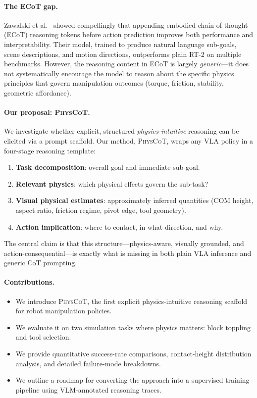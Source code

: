 \documentclass{article}
\newcommand{\physcot}{\textsc{PhysCoT}}
\begin{document}
\paragraph{The ECoT gap.}
Zawalski et al.~\citep{zawalski2024ecot} showed compellingly that
appending embodied chain-of-thought (ECoT) reasoning tokens before action
prediction improves both performance and interpretability.
Their model, trained to produce natural language sub-goals, scene descriptions,
and motion directions, outperforms plain RT-2 on multiple benchmarks.
However, the reasoning content in ECoT is largely \emph{generic}—it does not
systematically encourage the model to reason about the specific physics
principles that govern manipulation outcomes (torque, friction, stability,
geometric affordance).

\paragraph{Our proposal: \physcot{}.}
We investigate whether explicit, structured \emph{physics-intuitive} reasoning
can be elicited via a prompt scaffold.
Our method, \physcot{}, wraps any VLA policy in a four-stage reasoning template:
\begin{enumerate}
  \item[\textbf{A.}] \textbf{Task decomposition}: overall goal and immediate sub-goal.
  \item[\textbf{B.}] \textbf{Relevant physics}: which physical effects govern the sub-task?
  \item[\textbf{C.}] \textbf{Visual physical estimates}: approximately inferred quantities
                     (COM height, aspect ratio, friction regime, pivot edge, tool geometry).
  \item[\textbf{D.}] \textbf{Action implication}: where to contact, in what direction, and why.
\end{enumerate}
The central claim is that this structure—physics-aware, visually grounded,
and action-consequential—is exactly what is missing in both plain VLA inference
and generic CoT prompting.

\paragraph{Contributions.}
\begin{itemize}
  \item We introduce \physcot{}, the first explicit physics-intuitive
        reasoning scaffold for robot manipulation policies.
  \item We evaluate it on two simulation tasks where physics matters:
        block toppling and tool selection.
  \item We provide quantitative success-rate comparisons, contact-height
        distribution analysis, and detailed failure-mode breakdowns.
  \item We outline a roadmap for converting the approach into a supervised
        training pipeline using VLM-annotated reasoning traces.
\end{itemize}
\end{document}
